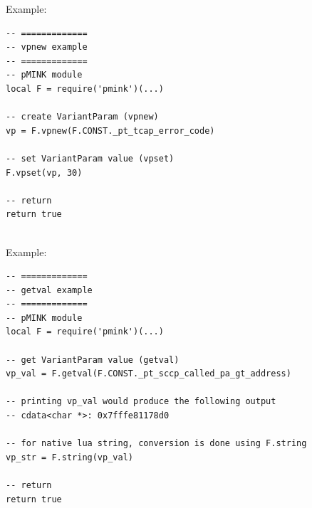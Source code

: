 \documentclass[a4paper,latin]{paper}
\begin{document}
\noindent{}Example:
\begin{lstlisting}[style=LuaInputStyle, belowskip=4\baselineskip, upquote=true]
-- =============
-- vpnew example 
-- =============
-- pMINK module
local F = require('pmink')(...)

-- create VariantParam (vpnew)
vp = F.vpnew(F.CONST._pt_tcap_error_code)

-- set VariantParam value (vpset)
F.vpset(vp, 30)

-- return
return true
\end{lstlisting}
\clearpage

\\

\noindent{}Example:
\begin{lstlisting}[style=LuaInputStyle, belowskip=\baselineskip, upquote=true]
-- =============
-- getval example 
-- =============
-- pMINK module
local F = require('pmink')(...)

-- get VariantParam value (getval)
vp_val = F.getval(F.CONST._pt_sccp_called_pa_gt_address)

-- printing vp_val would produce the following output
-- cdata<char *>: 0x7fffe81178d0

-- for native lua string, conversion is done using F.string
vp_str = F.string(vp_val)

-- return
return true
\end{lstlisting}
\end{document}
